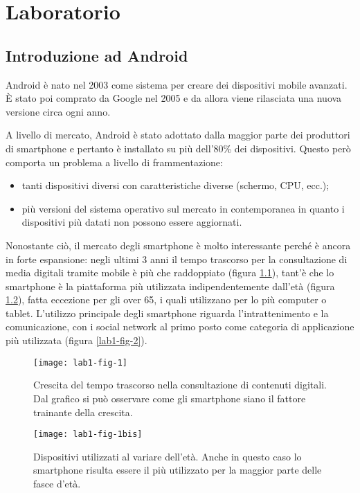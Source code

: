 \part{Laboratorio}

\chapter{Introduzione ad Android}

Android è nato nel 2003 come sistema per creare dei dispositivi mobile
avanzati.
\`E stato poi comprato da Google nel 2005 e da allora viene rilasciata
una nuova versione circa ogni anno.

A livello di mercato, Android è stato adottato dalla maggior parte dei
produttori di smartphone e pertanto è installato su più dell'80\% dei
dispositivi.
Questo però comporta un problema a livello di frammentazione:

\begin{itemize}
	\item tanti dispositivi diversi con caratteristiche diverse (schermo, CPU, ecc.);
	\item più versioni del sistema operativo sul mercato in contemporanea in quanto i dispositivi più datati non possono essere aggiornati.
\end{itemize}

Nonostante ciò, il mercato degli smartphone è molto interessante perché è ancora in forte espansione: negli ultimi 3 anni il tempo trascorso per la consultazione di media digitali tramite mobile è più che raddoppiato (figura \ref{lab1-fig-1}), tant'è che lo smartphone è la piattaforma più utilizzata indipendentemente dall'età (figura \ref{lab1-fig-1bis}), fatta eccezione per gli over 65, i quali utilizzano per lo più computer o tablet.
L'utilizzo principale degli smartphone riguarda l'intrattenimento e la comunicazione, con i social network al primo posto come categoria di applicazione più utilizzata (figura \ref{lab1-fig-2}).


\begin{figure}[htbp]
	\centering
	\texttt{[image: lab1-fig-1]}
	\caption[Crescita del tempo trascorso nella consultazione di contenuti digitali]{Crescita del tempo trascorso nella consultazione di contenuti digitali. Dal grafico si può osservare come gli smartphone siano il fattore trainante della crescita.}\label{lab1-fig-1}
\end{figure}

\begin{figure}[htbp]
	\centering
	\texttt{[image: lab1-fig-1bis]}
	\caption[Dispositivi utilizzati al variare dell'età]{Dispositivi utilizzati al variare dell'età. Anche in questo caso lo smartphone risulta essere il più utilizzato per la maggior parte delle fasce d'età.}\label{lab1-fig-1bis}
\end{figure}


